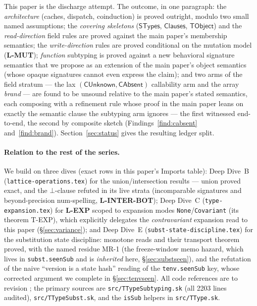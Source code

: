 \documentclass[11pt]{article}
\newcommand{\STypes}{\mathsf{STypes}}
\newcommand{\Clauses}{\mathsf{Clauses}}
\begin{document}
\noindent
This paper is the discharge attempt. The outcome, in one paragraph: the
\emph{architecture} (caches, dispatch, coinduction) is proved outright,
modulo two small named assumptions; the \emph{covering skeletons}
($\STypes$, $\Clauses$, $\mathsf{TObject}$) and the \emph{read-direction}
field rules are proved against the main paper's membership semantics; the
\emph{write-direction} rules are proved conditional on the mutation model
(\textbf{L-MUT}); \emph{function} subtyping is proved against a new
behavioral signature semantics that we propose as an extension of the main
paper's object semantics (whose opaque signatures cannot even express the
claim); and two arms of the field stratum --- the lax
$(\mathsf{CUnknown},\mathsf{CAbsent})$ callability arm and the array
\emph{brand} --- are found to be unsound relative to
the main paper's stated semantics, each composing with a refinement rule
whose proof in the main paper leans on exactly
the semantic clause the subtyping arm ignores --- the first witnessed
end-to-end, the second by composite sketch
(Findings~\ref{find:cabsent} and~\ref{find:brand}).
Section~\ref{sec:status} gives the resulting ledger split.

\paragraph{Relation to the rest of the series.}
We build on three dives (exact rows in this paper's Imports table):
Deep Dive~B (\texttt{lattice-operations.tex}) for the union/intersection
results --- union proved exact, and the $\bot$-clause refuted in its
live strata (incomparable signatures and
beyond-precision num-spelling, \textbf{L-INTER-BOT});
Deep Dive~C (\texttt{type-expansion.tex}) for \textbf{L-EXP} scoped to
expansion modes \texttt{None}/\texttt{Covariant} (its theorem T-EXP),
which explicitly delegates the \emph{contravariant} expansion read to this
paper (\S\ref{sec:variance}); and Deep Dive~E
(\texttt{subst-state-discipline.tex}) for the substitution state
discipline: monotone reads and their transport theorem proved,
with the named residue MR-1 (the freeze-window memo hazard, which lives in
\texttt{subst.seenSub} and is \emph{inherited} here, \S\ref{sec:substseen}),
and the refutation of the naive ``version is a state hash'' reading of the
\texttt{tenv.seenSub} key, whose corrected argument we complete in
\S\ref{sec:tenvseen}. All code references are to revision
\texttt{\skjspinhash}; the primary sources are
\texttt{src/TTypeSubtyping.sk} (all 2203 lines audited),
\texttt{src/TTypeSubst.sk}, and the \texttt{isSub} helpers in
\texttt{src/TType.sk}.
\end{document}
